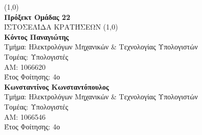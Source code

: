 \documentclass{acmart}
\begin{document}
       \begin{titlepage}
              \begin{center}
              \vspace*{1cm}

              \line(1,0){\textwidth}\\
              \textbf{Πρόξεκτ Ομάδας 22}\\
              \vspace{0.5cm}
              ΙΣΤΟΣΕΛΊΔΑ ΚΡΑΤΉΣΕΩΝ
              \vspace{1.5cm}
              \line(1,0){\textwidth}\\
              \textbf{Κόντος Παναγιώτης}\\
              Τμήμα: Ηλεκτρολόγων Μηχανικών \& Τεχνολογίας Υπολογιστών\\
              Τομέας: Υπολογιστές\\
              ΑΜ: 1066620\\
              Έτος Φοίτησης: 4ο\\
              \vspace{0.8cm}
              \textbf{Κωνσταντίνος Κωνσταντόπουλος}\\
                     Τμήμα: Ηλεκτρολόγων Μηχανικών \& Τεχνολογίας Υπολογιστών\\
              Τομέας: Υπολογιστές\\
              ΑΜ: 1066546\\
              Έτος Φοίτησης: 4ο\\

              \vspace{0.8cm}


              
              \end{center}
       \end{titlepage}
\end{document}

